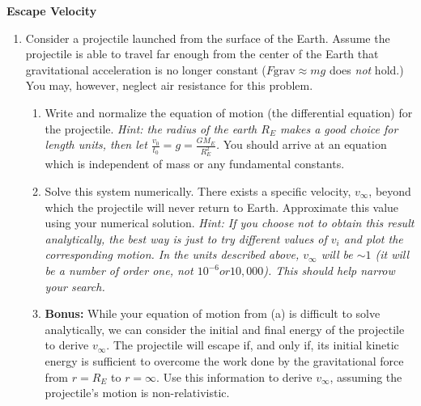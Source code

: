 \documentclass{article}
\begin{document}
{\large \textbf{Escape Velocity} }
\begin{enumerate}[resume]
	\item Consider a projectile launched from the surface of the Earth. Assume the projectile is able to travel far enough from the center of the Earth that gravitational acceleration is no longer constant ($F\mathrm{grav}\approx mg$ does \textit{not} hold.) You may, however, neglect air resistance for this problem.
	\begin{enumerate}
		\item Write and normalize the equation of motion (the differential equation) for the projectile. \textit{Hint: the radius of the earth $R_E$ makes a good choice for length units, then let $\frac{v_0}{t_0}=g=\frac{G M_E}{R_E^2}$.} You should arrive at an equation which is independent of mass or any fundamental constants.
		\item Solve this system numerically. There exists a specific velocity, $v_\infty$, beyond which the projectile will never return to Earth. Approximate this value using your numerical solution. \textit{Hint: If you choose not to obtain this result analytically, the best way is just to try different values of $v_i$ and plot the corresponding motion. In the units described above, $v_\infty$ will be $\sim 1$ (it will be a number of order one, not $10^{-6} or 10,000$). This should help narrow your search. }
		\item \textbf{Bonus:} While your equation of motion from (a) is difficult to solve analytically, we can consider the initial and final energy of the projectile to derive $v_\infty$. The projectile will escape if, and only if, its initial kinetic energy is sufficient to overcome the work done by the gravitational force from $r=R_E$ to $r=\infty$. Use this information to derive $v_\infty$, assuming the projectile's motion is non-relativistic.
	\end{enumerate}
\end{enumerate}
\end{document}
